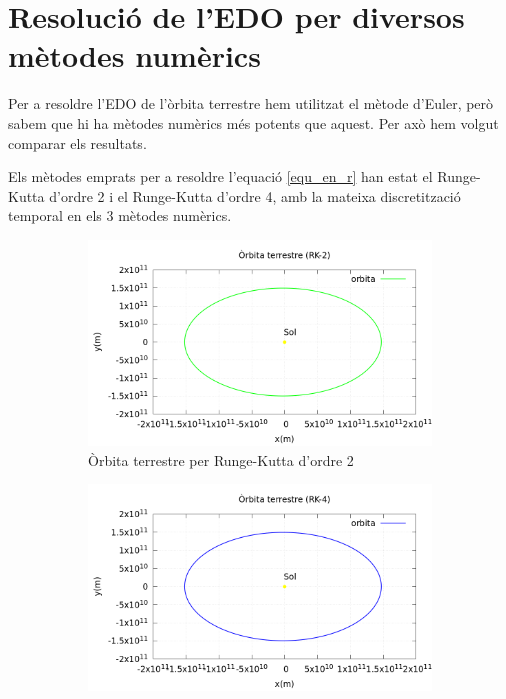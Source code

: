 \documentclass[11pt]{article}
\begin{document}
\section{Resolució de l'EDO per diversos mètodes numèrics}\label{sec: edos}
Per a resoldre l'EDO de l'òrbita terrestre hem utilitzat el mètode d'Euler, però sabem que hi ha mètodes numèrics més potents que aquest. Per axò hem volgut comparar els resultats.

Els mètodes emprats per a resoldre l'equació \eqref{equ_en_r} han estat el Runge-Kutta d'ordre 2 i el Runge-Kutta d'ordre 4, amb la mateixa discretització temporal en els 3 mètodes numèrics.

\begin{figure}[H]
    \centering
    \begin{subfigure}{0.5\textwidth}
        \centering
        \includegraphics[width=\textwidth]{orbitaRK2.PNG}
        \caption{Òrbita terrestre per Runge-Kutta d'ordre 2}
        \label{fig: orbitaRK2}
    \end{subfigure}%
    \vspace{0.01\textwidth}%
    \begin{subfigure}{0.5\textwidth}
        \centering
        \includegraphics[width=\textwidth]{orbitaRK4.PNG}

\end{subfigure}
\end{figure}
\end{document}
